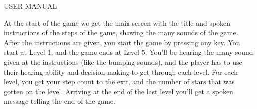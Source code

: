 USER MANUAL

At the start of the game we get the main screen with the title and spoken instructions of the steps of the game, showing the many sounds of the game.
After the instructions are given, you start the game by pressing any key. You start at Level 1, and the game ends at Level 5. You'll be hearing the many sound given at the instructions (like the bumping sounds), and the player has to use their hearing ability and decision making to get through each level.
For each level, you get your step count to the exit, and the number of stars that was gotten on the level.
Arriving at the end of the last level you'll get a spoken message telling the end of the game.
